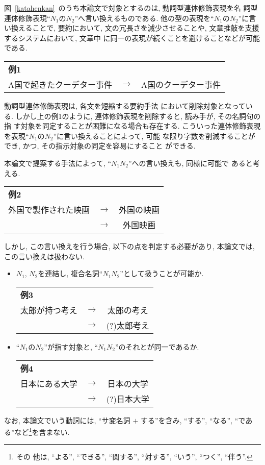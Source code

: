 図~\ref{katahenkan}~のうち本論文で対象とするのは, 動詞型連体修飾表現を名
詞型連体修飾表現``$N_1のN_2$''へ言い換えるものである. 
他の型の表現を``$N_1のN_2$''に言い換えることで, 要約において, 
文の冗長さを減少させることや, 文章推敲を支援するシステムにおいて, 文章中
に同一の表現が続くことを避けることなどが可能である. 
\begin{center}
\begin{tabular}{lcl}
{\bf 例1} &&\\
A国で起きたクーデター事件 & $\to$ & A国のクーデター事件\\
\end{tabular}
\end{center}

動詞型連体修飾表現は, 各文を短縮する要約手法
\cite{mikami99,yamamoto95}において削除対象となっている. 
しかし上の例1のように, 連体修飾表現を削除すると, 読み手が, その名詞句の指
す対象を同定することが困難になる場合も存在する. 
こういった連体修飾表現を表現``$N_1のN_2$''に言い換えることによって, 可能
な限り字数を削減することができ, かつ, その指示対象の同定を容易にすること
ができる. 

本論文で提案する手法によって, ``$N_1 N_2$''への言い換えも, 同様に可能で
あると考える. 
\begin{center}
\begin{tabular}{lcc}
{\bf 例2}&&\\
外国で製作された映画 & $\to$ & 外国の映画\\
& $\to$ & 外国映画\\
\end{tabular}
\end{center}
しかし, この言い換えを行う場合, 以下の点を判定する必要があり, 本論文では, 
この言い換えは扱わない. 
\begin{itemize}
\vspace{-2mm}
\item $N_1$, $N_2$を連結し, 複合名詞``$N_1N_2$''として扱うことが可能か.\\
\begin{center}
\begin{tabular}{lcc}
 {\bf 例3}&&\\
太郎が持つ考え& $\to$ & 太郎の考え\\
 & $\to$ & (?)太郎考え\\
\end{tabular}
\end{center}
\item ``$N_1のN_2$''が指す対象と, ``$N_1N_2$''のそれとが同一であるか.
\begin{center}
\begin{tabular}{lcc}
 {\bf 例4}&&\\
日本にある大学 & $\to$ & 日本の大学\\
 & $\to$ & (?)日本大学\\
\end{tabular}
\end{center}
\end{itemize}
\vspace{5mm}
なお, 本論文でいう動詞には, ``サ変名詞 $+$ する''を含み, 
``する'', ``なる'', ``である''など\footnote{その
他は, ``よる'', ``できる'', ``関する'', ``対する'', ``いう'', ``つく'',
``伴う''.}を含まない.

